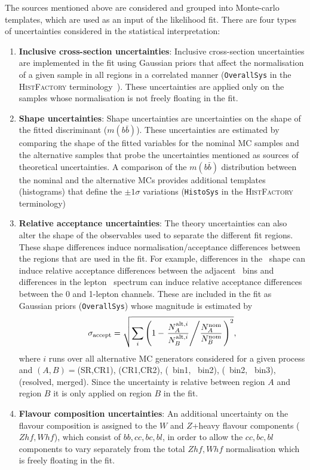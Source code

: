 \par The sources mentioned above are considered and grouped into Monte-carlo templates, which are used as an input of the likelihood fit. There are four types of uncertainties considered in the statistical interpretation:

\begin{enumerate}
    \item \textbf{Inclusive cross-section uncertainties}: Inclusive cross-section uncertainties are implemented in the fit using Gaussian priors that affect the normalisation of a given sample in all regions in a correlated manner (\texttt{OverallSys} in the \textsc{HistFactory} terminology~\cite{Cranmer:1456844}). These uncertainties are applied only on the samples whose normalisation is not freely floating in the fit.
    \item \textbf{Shape uncertainties}: Shape uncertainties are uncertainties on the shape of the fitted discriminant ($m(b\bar{b})$). These uncertainties are estimated by comparing the shape of the fitted variables for the nominal MC samples and the alternative samples that probe the uncertainties mentioned as sources of theoretical uncertainties. A comparison of the $m(b\bar{b})$ distribution between the nominal and the alternative MCs provides additional templates (histograms) that define the $\pm1\sigma$ variations (\texttt{HistoSys} in the \textsc{HistFactory} terminology)
    \item \textbf{Relative acceptance uncertainties}: The theory uncertainties can also alter the shape of the observables used to separate the different fit regions. These shape differences induce normalisation/acceptance differences between the regions that are used in the fit. For example, differences in the \met~shape can induce relative acceptance differences between the adjacent \met~bins and differences in the lepton \pt~spectrum can induce relative acceptance differences between the 0 and 1-lepton channels. These are included in the fit as Gaussian priors (\texttt{OverallSys}) whose magnitude is estimated by
    \begin{equation}
    \sigma_{\text{accept}}=\sqrt{\sum_i \left( 1 - \left. \frac{N_A^{\text{alt},i}}{N_B^{\text{alt},i}} \middle/ \frac{N_A^{\text{nom}}}{N_B^{\text{nom}}} \right. \right)^2},
    \end{equation}
    where $i$ runs over all alternative MC generators considered for a given process and $(A,B)=$(SR,CR1), (CR1,CR2), (\met~bin1, \met~bin2), (\met~bin2, \met~bin3), (resolved, merged). Since the uncertainty is relative between region $A$ and region $B$ it is only applied on region $B$ in the fit.
    \item \textbf{Flavour composition uncertainties}: An additional uncertainty on the flavour composition is assigned to the $W$ and $Z$+heavy flavour components ($Zhf, Whf$), which consist of $bb,cc,bc,bl$, in order to allow the $cc,bc,bl$ components to vary separately from the total $Zhf, Whf$ normalisation which is freely floating in the fit.
\end{enumerate}


